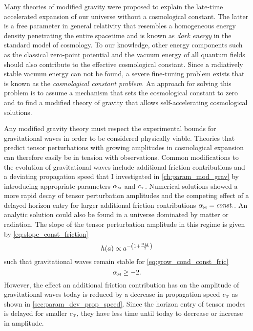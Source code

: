 \documentclass[12pt,parskip=half]{scrreprt}
\begin{document}
Many theories of modified gravity were proposed to explain the late-time accelerated expansion of our universe without a cosmological constant. The latter is a free parameter in general relativity that resembles a homogeneous energy density penetrating the entire spacetime and is known as \emph{dark energy} in the \LCDM standard model of cosmology. To our knowledge, other energy components such as the classical zero-point potential and the vacuum energy of all quantum fields should also contribute to the effective cosmological constant. Since a radiatively stable vacuum energy can not be found, a severe fine-tuning problem exists that is known as the \emph{cosmological constant problem}. An approach for solving this problem is to assume a mechanism that sets the cosmological constant to zero and to find a modified theory of gravity that allows self-accelerating cosmological solutions.

Any modified gravity theory must respect the experimental bounds for gravitational waves in order to be considered physically viable. Theories that predict tensor perturbations with growing amplitudes in cosmological expansion can therefore easily be in tension with observations. Common modifications to the evolution of gravitational waves include additional friction contributions and a deviating propagation speed that I investigated in \autoref{ch:param_mod_grav} by introducing appropriate parameters \({\alpha_{\textnormal{\tiny{M}}}}\) and \({c_{\textnormal{\tiny{T}}}}\). Numerical solutions showed a more rapid decay of tensor perturbation amplitudes and the competing effect of a delayed horizon entry for larger additional friction contributions \({\alpha_{\textnormal{\tiny{M}}}}=\textnormal{\textit{const.}}\). An analytic solution could also be found in a universe dominated by matter or radiation. The slope of the tensor perturbation amplitude in this regime is given by \eqref{eq:slope_const_friction}
\begin{equation}
	h(a) \propto a^{-\del{1+\frac{\alphaM}{2}}}
\end{equation}
such that gravitational waves remain stable for \eqref{eq:grow_cond_const_fric}
\begin{equation}
	{\alpha_{\textnormal{\tiny{M}}}} \geq -2
	\mathpunct{.}
\end{equation}
However, the effect an additional friction contribution has on the amplitude of gravitational waves today is reduced by a decrease in propagation speed \({c_{\textnormal{\tiny{T}}}}\) as shown in \autoref{sec:param_dev_prop_speed}. Since the horizon entry of tensor modes is delayed for smaller \({c_{\textnormal{\tiny{T}}}}\), they have less time until today to decrease or increase in amplitude.
\end{document}
